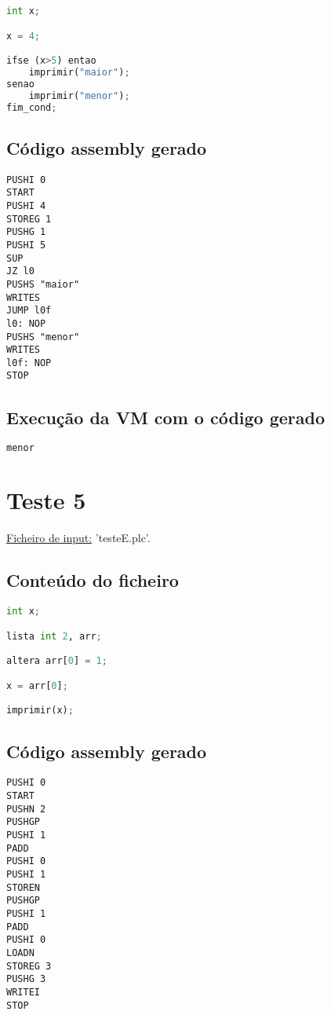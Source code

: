 \documentclass[11pt,a4paper]{report}
\begin{document}
\begin{lstlisting}[language=python]
int x;

x = 4;

ifse (x>5) entao 
    imprimir("maior");
senao
    imprimir("menor");
fim_cond;
\end{lstlisting}

\subsection{Código assembly gerado}
\begin{lstlisting}[languague=Assembler]
PUSHI 0
START
PUSHI 4
STOREG 1
PUSHG 1
PUSHI 5
SUP
JZ l0
PUSHS "maior"
WRITES
JUMP l0f
l0: NOP
PUSHS "menor"
WRITES
l0f: NOP
STOP
\end{lstlisting}

\subsection{Execução da VM com o código gerado}
\begin{lstlisting}[language=python]
menor
\end{lstlisting}

\section{Teste 5}

\underline{Ficheiro de input:} 'testeE.plc'.

\subsection{Conteúdo do ficheiro}

\begin{lstlisting}[language=python]
int x;

lista int 2, arr;

altera arr[0] = 1;

x = arr[0];

imprimir(x);
\end{lstlisting}

\subsection{Código assembly gerado}
\begin{lstlisting}[languague=Assembler]
PUSHI 0
START
PUSHN 2
PUSHGP
PUSHI 1
PADD
PUSHI 0
PUSHI 1
STOREN
PUSHGP
PUSHI 1
PADD
PUSHI 0
LOADN
STOREG 3
PUSHG 3
WRITEI
STOP
\end{lstlisting}
\end{document}
